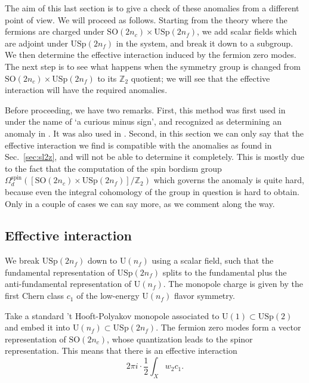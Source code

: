 \documentclass[12pt]{article}
\numberwithin{equation}{section}
\def\bZ{\mathbb{Z}}
\def\U{\mathrm{U}}
\def\SO{\mathrm{SO}}
\def\USp{\mathrm{USp}}
\begin{document}
The aim of this last section is to give a check of these anomalies from a different point of view.
We will proceed as follows. 
Starting from the theory where the fermions are charged under $\SO(2n_c)\times \USp(2n_f)$,
we add scalar fields which are adjoint under $\USp(2n_f)$ in the system, and break it down to a subgroup.
We then determine the effective interaction induced by the fermion zero modes.
The next step is to see what happens when the symmetry group is changed from $\SO(2n_c)\times \USp(2n_f)$ to its $\bZ_2$ quotient;
we will see that the effective interaction will have the required anomalies.

Before proceeding, we have two remarks.
First, this method was first used in \cite[Sec.~4]{Witten:1995gf} under the name of `a curious minus sign', and recognized as determining an anomaly in \cite[Sec.~2.4.3]{Cordova:2018acb}.
It was also used in \cite[Sec.~3.1 and Sec.~5.1.2]{Wang:2018qoy}.
Second, in this section we can only say that the effective interaction we find is compatible with the anomalies
as found in Sec.~\ref{sec:sl2z},
and will not be able to determine it completely.
This is mostly due to the fact that the computation of the spin bordism group $\Omega^\text{spin}_d([\SO(2n_c)\times \USp(2n_f)]/\bZ_2)$ which governs the anomaly is quite hard, 
because even the integral cohomology of the group in question is hard to obtain.
Only in a couple of cases we can say more, as we comment along the way.

\subsection{Effective interaction}
We break $\USp(2n_f)$ down to $\U(n_f)$ using a scalar field,
such that the fundamental representation of $\USp(2n_f)$ splits to the fundamental plus the anti-fundamental representation of $\U(n_f)$.
The monopole charge is given by the first Chern class $c_1$ of the low-energy $\U(n_f)$ flavor symmetry.

Take a standard 't Hooft-Polyakov monopole associated to $\U(1)\subset \USp(2)$
and embed it into  $\U(n_f)\subset \USp(2n_f)$.
The fermion zero modes form a vector representation of $\SO(2n_c)$,
whose quantization leads to the spinor representation.
This means that there is an effective interaction \begin{equation}
2\pi i \cdot \frac12 \int_X w_2 c_1.
\end{equation} %
\end{document}
